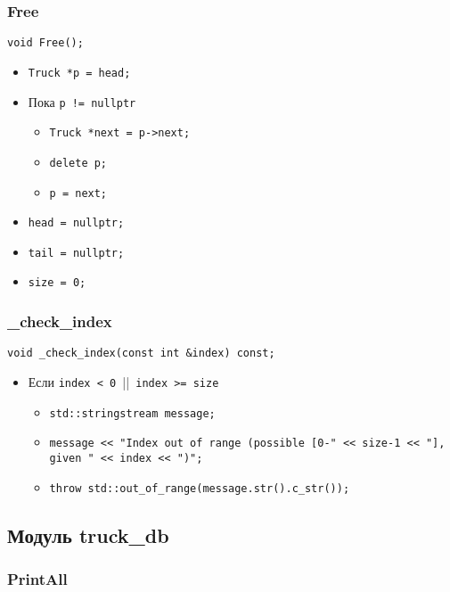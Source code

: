 \subsubsection*{Free}

\begin{lstlisting}
void Free();
\end{lstlisting}

\begin{itemize}
	\item \verb|Truck *p = head;|
	\item Пока \verb|p != nullptr|
	\begin{itemize}
		\item \verb|Truck *next = p->next;|
		\item \verb|delete p;|
		\item \verb|p = next;|
	\end{itemize}
	\item \verb|head = nullptr;|
	\item \verb|tail = nullptr;|
	\item \verb|size = 0;|
\end{itemize}


\subsubsection*{\_check\_index}

\begin{lstlisting}
void _check_index(const int &index) const;
\end{lstlisting}

\begin{itemize}
	\item Если \verb|index < 0 |||\verb| index >= size|
	\begin{itemize}
		\item \verb|std::stringstream message;|
		\item \verb|message << "Index out of range (possible [0-" << size-1 << "], given " << index << ")";|
		\item \verb|throw std::out_of_range(message.str().c_str());|
	\end{itemize}
\end{itemize}


\subsection*{Модуль truck\_db}


\subsubsection*{PrintAll}

